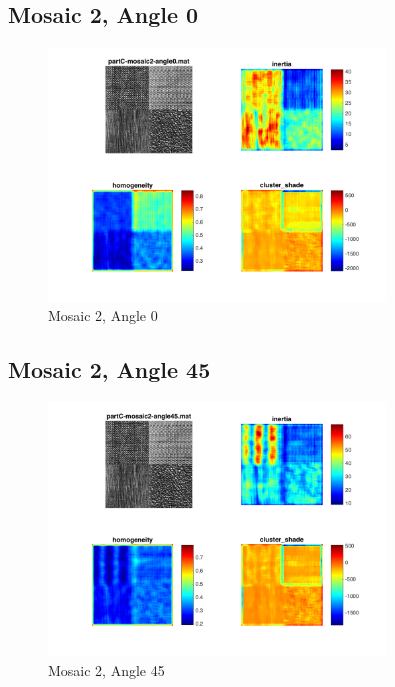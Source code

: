 \documentclass[a4paper,12pt,titlepage]{article}
\begin{document}
\subsection{Mosaic 2, Angle 0}
\begin{figure}[H]
\includegraphics[width=0.8\textwidth]{partC-mosaic2-angle0}
\caption{Mosaic 2, Angle 0}
\label{fig:Mosaic2Angle0}
\end{figure}

\subsection{Mosaic 2, Angle 45}
\begin{figure}[H]
\includegraphics[width=0.8\textwidth]{partC-mosaic2-angle45}
\caption{Mosaic 2, Angle 45}
\label{fig:Mosaic2Angle45}
\end{figure}
\end{document}
